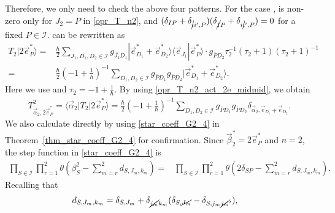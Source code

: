 \documentclass[10pt,a4paper]{amsart}
\numberwithin{equation}{section}
\begin{document}
Therefore, we only need to check the above four patterns. For the case
,
is non-zero only for
$
J_{2}
=
P
$
in \eqref{opr_T_n2},
and
$
 (
\delta_{IP}
+
\delta_{\cancel{i}i',P}
 )
 (
\delta_{\cancel{I}P}
+
\delta_{i\cancel{i}',P}
 )
=
0
$
for a fixed $P\in\mathcal{I}$.
can be rewritten as
\begin{align}
T_{2}
|
2
\vec{e}_{P}^{\ast}
\rangle
={}&
\frac{\hbar}{2}
\sum_{
J_{1},D_{1},D_{2}
\in
\mathcal{I}
}
g_{\overline{J_{1}}D_{1}}
|
 \vec{e}_{D_{1}}^{\ast}
 +
 \vec{e}_{D_{2}}^{\ast}
\rangle
\big\langle
\vec{e}_{J_{1}}
|
\vec{e}_{P}^{\ast}
\rangle
\cdot
g_{\overline{P}D_{2}}
\tau_{2}^{-1}
 (
 \tau_{2}
 +
 1
 )
 (
 \tau_{2}
 +
 1
 )^{-1}
\nonumber
\\
={}&
\frac{\hbar}{2}
 \left(
-1
+
\frac{1}{\hbar}
 \right)^{-1}
\sum_{
D_{1},D_{2}
\in
\mathcal{I}
}
g_{\overline{P}D_{1}}
g_{\overline{P}D_{2}}
|
 \vec{e}_{D_{1}}^{\ast}
 +
 \vec{e}_{D_{2}}^{\ast}
\rangle.
\label{opr_T_n2_act_2e_midmid}
\end{align}
Here we use
and
$
\tau_{2}
=
-1
+
\frac{1}{\hbar}
$.
By using \eqref{opr_T_n2_act_2e_midmid}, we obtain
\begin{align}
T^{2}_{\vec{\alpha}_{2},2\vec{e}_{P}^{\ast}}
=
\langle
\vec{\alpha}_{2}
|
T_{2}
|
2
\vec{e}_{P}^{\ast}
\rangle
=
\frac{\hbar}{2}
 \left(
-1
+
\frac{1}{\hbar}
 \right)^{-1}
\sum_{
D_{1},D_{2}
\in
\mathcal{I}
}
g_{\overline{P}D_{1}}
g_{\overline{P}D_{2}}
\delta_{
\vec{\alpha}_{2},
\vec{e}_{D_{1}}
+
\vec{e}_{D_{2}}
}
.
\label{T2_2e_opr}
\end{align}
We also calculate directly  by using \eqref{star_coeff_G2_4} in Theorem~\ref{thm_star_coeff_G2_4} for confirmation. Since
$
\vec{\beta}_{2}^{\ast}
=
2\vec{e}_{P}^{\ast}
$
and $n=2$, the step function in \eqref{star_coeff_G2_4} is
\begin{align*}
\prod_{
S
\in
\mathcal{I}
}
\prod_{r=1}^{2}
\theta
 \left(
 \beta_{S}^{2}
 -
 \sum_{m=r}^{2}
 d_{S,J_{m},k_{m}}
 \right)
=&
\prod_{
S
\in
\mathcal{I}
}
\prod_{r=1}^{2}
\theta
 \left(
 2
 \delta_{SP}
 -
 \sum_{m=r}^{2}
 d_{S,J_{m},k_{m}}
 \right)
.
\end{align*}
Recalling that
\begin{align*}
d_{
 S,
 J_{m},
 k_{m}
}
={}&
\delta_{
 S,
 J_{m}
}
+
\delta_{\cancel{j_{m}}k_{m}}
 (
 \delta_{
 S,
 \cancel{J_{m}}
 }
 -
 \delta_{
 S,
 j_{m}\cancel{j_{m}}'
 }
 )
,
\end{align*}
\end{document}
